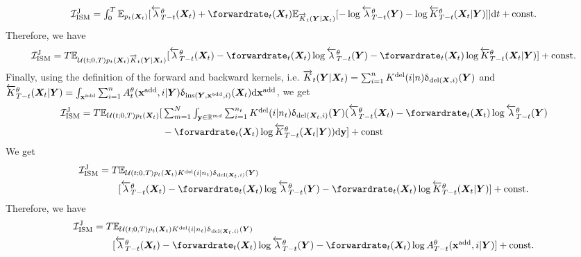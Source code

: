 \begin{align}
  \textstyle 
    \mathcal{I}_{\text{ISM}}^{\text{J}} = \int_{0}^T \mathbb{E}_{p_t(\mX_t)} [ \backwardrate_{T-t}^\theta(\mX_t) + \forwardrate_t(\mX_t) \mathbb{E}_{\ftk_t(\mY | \mX_t)} [ - \log \backwardrate_{T-t}^\theta(\mY) - \log \btk_{T-t}^\theta(\mX_t | \mY) ] ] \rmd t + \text{const} . 
\end{align}
Therefore, we have 
\begin{align}
   \mathcal{I}_{\text{ISM}}^{\text{J}} =  T\mathbb{E}_{\mathcal{U}(t; 0, T) p_t(\mX_t) \ftk_t(\mY | \mX_t) } [ \backwardrate_{T-t}^\theta(\mX_t) - \forwardrate_t(\mX_t) \log \backwardrate_{T-t}^\theta(\mY) - \forwardrate_t(\mX_t) \log \btk_{T-t}^\theta(\mX_t | \mY) ] + \text{const} . 
\end{align}
Finally, using  the definition of the forward and backward kernels, i.e.
$\overrightarrow{K}_t({\bm{Y}} | {\bm{X}}_t) = \sum_{i=1}^n K^{\textup{del}}(i | n) \updelta_{\text{del}({\bm{X}},
  i)}({\bm{Y}})$ and
$\overleftarrow{K}_{T-t}^\theta({\bm{X}}_t | {\bm{Y}}) = \int_{{\mathbf{x}}^{\textup{add}}} \sum_{i=1}^{n}
A^\theta_t({\mathbf{x}}^{\textup{add}}, i | {\bm{Y}}) \updelta_{\text{ins}({\bm{Y}}, {\mathbf{x}}^{\textup{add}}, i)}({\bm{X}}_t) \mathrm{d}
{\mathbf{x}}^{\textup{add}}$, we get
\begin{align}
   \mathcal{I}_{\text{ISM}}^{\text{J}} =  T\mathbb{E}_{\mathcal{U}(t; 0, T) p_t(\mX_t) } [&\textstyle  \inty \sum_{i=1}^{n_t} \delidxdist(i | n_t) \updelta_{\text{del}(\mX_t, i)}(\mY) ( \backwardrate_{T-t}^\theta(\mX_t) - \forwardrate_t(\mX_t) \log \backwardrate_{T-t}^\theta(\mY) \\ 
    &\textstyle - \forwardrate_t(\mX_t) \log \btk_{T-t}^\theta(\mX_t | \mY) ) \rmd \y ] + \text{const} 
\end{align}
We get 
\begin{align}
  \mathcal{I}_{\text{ISM}}^{\text{J}} &=  T\mathbb{E}_{\mathcal{U}(t; 0, T) p_t(\mX_t) \delidxdist(i | n_t) \updelta_{\text{del}(\mX_t, i)}(\mY) } \\
  & \qquad [\textstyle  \backwardrate_{T-t}^\theta(\mX_t) - \forwardrate_t(\mX_t) \log \backwardrate_{T-t}^\theta(\mY) - \forwardrate_t(\mX_t) \log \btk_{T-t}^\theta(\mX_t | \mY) ] + \text{const} . 
\end{align}
Therefore, we have 
\begin{align}
  \mathcal{I}_{\text{ISM}}^{\text{J}} &=  T\mathbb{E}_{\mathcal{U}(t; 0, T) p_t(\mX_t) \delidxdist(i | n_t) \updelta_{\text{del}(\mX_t, i)}(\mY) } \\
                                      &\qquad [\textstyle  \backwardrate_{T-t}^\theta(\mX_t) - \forwardrate_t(\mX_t) \log \backwardrate_{T-t}^\theta(\mY) - \forwardrate_t(\mX_t) \log A_{T-t}^\theta(\xadd, i | \mY) ] + \text{const} . 
\end{align}
